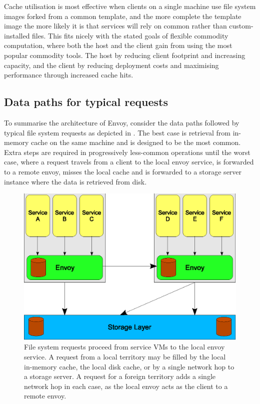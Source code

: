 Cache utilisation is most effective when clients on a single machine use file system images forked from a common template, and the more complete the template image the more likely it is that services will rely on common rather than custom-installed files. This fits nicely with the stated goals of flexible commodity computation, where both the host and the client gain from using the most popular commodity tools. The host by reducing client footprint and increasing capacity, and the client by reducing deployment costs and maximising performance through increased cache hits.

\subsection{Data paths for typical requests}

To summarise the architecture of Envoy, consider the data paths followed by typical file system requests as depicted in . The best case is retrieval from in-memory cache on the same machine and is designed to be the most common. Extra steps are required in progressively less-common operations until the worst case, where a request travels from a client to the local envoy service, is forwarded to a remote envoy, misses the local cache and is forwarded to a storage server instance where the data is retrieved from disk.

\begin{figure}[tp]
\centering
\includegraphics[width=\figwidth]{figures/hops}
\caption[Network paths taken by typical file requests]{File system requests proceed from service VMs to the local envoy service. A request from a local territory may be filled by the local in-memory cache, the local disk cache, or by a single network hop to a storage server. A request for a foreign territory adds a single network hop in each case, as the local envoy acts as the client to a remote envoy.}
\label{fig:hops}
\end{figure}

